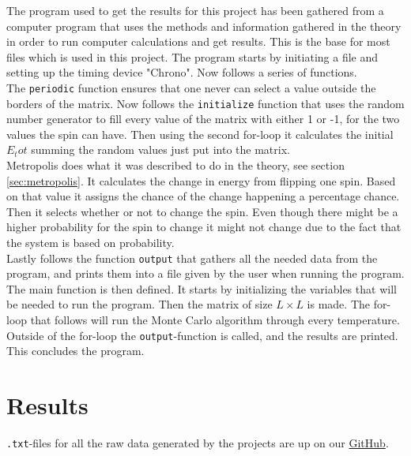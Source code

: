 \documentclass{article}
\begin{document}
The program used to get the results for this project has been gathered from a computer program that uses the methods and information gathered in the theory in order to run computer calculations and get results. This is the base for most files which is used in this project.  The program starts by initiating a file and setting up the timing device "Chrono". Now follows a series of functions. \\

The \texttt{periodic} function ensures that one never can select a value outside the borders of the matrix. Now follows the \texttt{initialize} function that uses the random number generator to fill every value of the matrix with either 1 or -1, for the two values the spin can have. Then using the second for-loop it calculates the initial $E_tot$ summing the random values just put into the matrix. \\

Metropolis does what it was described to do in the theory, see section \ref{sec:metropolis}. It calculates the change in energy from flipping one spin. Based on that value it assigns the chance of the change happening a percentage chance. Then it selects whether or not to change the spin. Even though there might be a higher probability for the spin to change it might not change due to the fact that the system is based on probability. \\

Lastly follows the function \texttt{output} that gathers all the needed data from the program, and prints them into a file given by the user when running the program. \\

The main function is then defined. It starts by initializing the variables that will be needed to run the program. Then the matrix of size $L \times L$ is made. The for-loop that follows will run the Monte Carlo algorithm through every temperature. Outside of the for-loop the \texttt{output}-function is called, and the results are printed. This concludes the program. \\
\fi

\vspace{1cm}

\section{Results} \label{sec:Results}

\iffalse
\texttt{.txt}-files for all the raw data generated by the projects are up on our \href{https://github.com/Erikbgram/Fys3150}{GitHub}. \\
\end{document}
